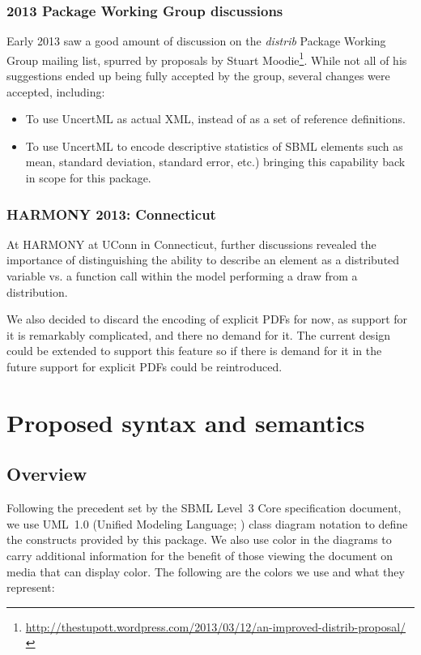 \documentclass[draftspec]{sbmlpkgspec}
\newcommand{\distribshort}{\emph{distrib}\xspace}
\begin{document}
\subsubsection{2013 Package Working Group discussions}

Early 2013 saw a good amount of discussion on the \distribshort Package Working Group mailing list, spurred by proposals by Stuart Moodie\footnote{\url{http://thestupott.wordpress.com/2013/03/12/an-improved-distrib-proposal/}}.  While not all of his suggestions ended up being fully accepted by the group, several changes were accepted, including:

\begin{itemize}
\item To use UncertML as actual XML, instead of as a set of reference definitions.
\item To use UncertML to encode descriptive statistics of SBML elements such as mean, standard deviation, standard error, etc.) bringing this capability back in scope for this package.
\end{itemize}


\subsubsection{HARMONY 2013: Connecticut}

At HARMONY at UConn in Connecticut, further discussions revealed the importance of distinguishing the ability to describe an element as a distributed variable vs. a function call within the model performing a draw from a distribution.

We also decided to discard the encoding of explicit PDFs for now, as
support for it is remarkably complicated, and there no demand for
it. The current design could be extended to support this feature so if
there is demand for it in the future support for explicit PDFs could
be reintroduced.

\section{Proposed syntax and semantics}

\subsection{Overview}

Following the precedent set by the SBML Level~3 Core specification
document, we use UML~1.0 (Unified Modeling Language;
\citealt{eriksson:1998,oestereich:1999}) class diagram notation to
define the constructs provided by this package.  We also use color in
the diagrams to carry additional information for the benefit of those
viewing the document on media that can display color.  The following are
the colors we use and what they represent:
\end{document}
